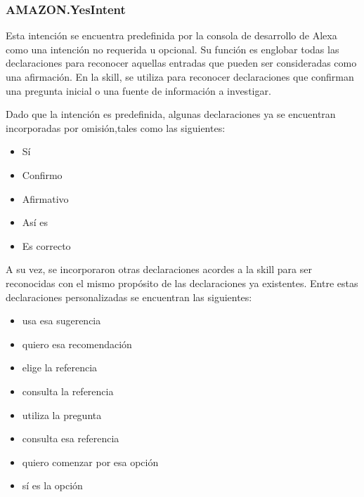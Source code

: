 
\subsubsection{AMAZON.YesIntent}
\label{YesIntentcapIV}

Esta intención se encuentra predefinida por la consola de desarrollo de Alexa como una intención no requerida u opcional. Su función es englobar todas las declaraciones para reconocer aquellas entradas que pueden ser consideradas como una afirmación. En la skill, se utiliza para reconocer declaraciones que confirman una pregunta inicial o una fuente de información a investigar.

Dado que la intención es predefinida, algunas declaraciones ya se encuentran incorporadas por omisión,tales como las siguientes:

\begin{itemize}
  \item Sí
  \item Confirmo
  \item Afirmativo
  \item Así es
  \item Es correcto
\end{itemize}

A su vez, se incorporaron otras declaraciones acordes a la skill para ser reconocidas con el mismo propósito de las declaraciones ya existentes. Entre estas declaraciones personalizadas se encuentran las siguientes:

\begin{itemize}
  \item usa esa sugerencia
  \item quiero esa recomendación
  \item elige la referencia
  \item consulta la referencia
  \item utiliza la pregunta
  \item consulta esa referencia
  \item quiero comenzar por esa opción
  \item sí es la opción
\end{itemize}


